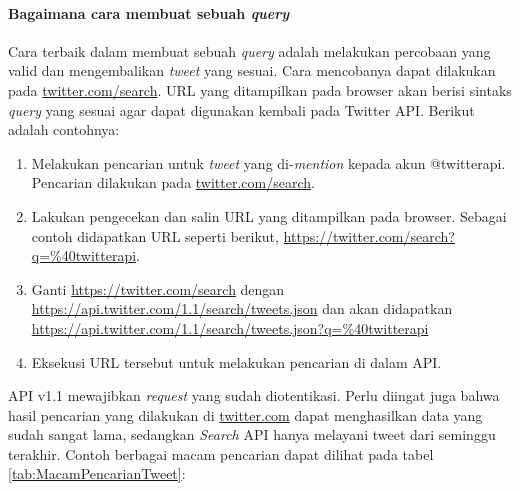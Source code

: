 \paragraph{Bagaimana cara membuat sebuah \textit{query}}
Cara terbaik dalam membuat sebuah \textit{query} adalah melakukan percobaan yang valid dan mengembalikan \textit{tweet} yang sesuai. Cara mencobanya dapat dilakukan pada \url{twitter.com/search}. URL yang ditampilkan pada browser akan berisi sintaks \textit{query} yang sesuai agar dapat digunakan kembali pada Twitter API. Berikut adalah contohnya:

\begin{enumerate}
	\item Melakukan pencarian untuk \textit{tweet} yang di-\textit{mention} kepada akun @twitterapi. Pencarian dilakukan pada \url{twitter.com/search}.
	\item Lakukan pengecekan dan salin URL yang ditampilkan pada browser. Sebagai contoh didapatkan URL seperti berikut, \url{https://twitter.com/search?q=\%40twitterapi}.
	\item Ganti \url{https://twitter.com/search} dengan \url{https://api.twitter.com/1.1/search/tweets.json} dan akan didapatkan \url{https://api.twitter.com/1.1/search/tweets.json?q=\%40twitterapi}
	\item Eksekusi URL tersebut untuk melakukan pencarian di dalam API.
\end{enumerate}

API v1.1 mewajibkan \textit{request} yang sudah diotentikasi. Perlu diingat juga bahwa hasil pencarian yang dilakukan di \url{twitter.com} dapat menghasilkan data yang sudah sangat lama, sedangkan \textit{Search} API hanya melayani tweet dari seminggu terakhir. Contoh berbagai macam pencarian dapat dilihat pada tabel \ref{tab:MacamPencarianTweet}:

